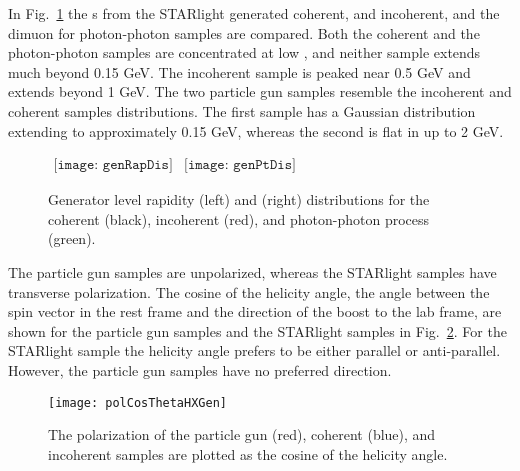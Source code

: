     In Fig.~\ref{fig:starlightRapPtDist} the \JPsi{}s \pt{} from the 
      STARlight generated coherent, and incoherent, and the dimuon \pt{} for 
      photon-photon samples are compared.
    Both the coherent and the photon-photon samples are concentrated at low 
      \pt{}, and neither sample extends much beyond 0.15 GeV.
    The incoherent sample is peaked near 0.5 GeV and extends beyond 1 GeV.
    The two particle gun samples resemble the incoherent and coherent samples
      \pt{} distributions.
    The first sample has a Gaussian \pt{} distribution extending to 
      approximately 0.15 GeV, whereas the second is flat in \pt{} up to
      2 GeV.
    \begin{figure}[!Hhbt]
      \centering
      $ \begin{array}{cc}
        \texttt{[image: genRapDis]} &
        \texttt{[image: genPtDis]}
      \end{array} $
      \caption{Generator level rapidity (left) and \pt{} (right) 
          distributions for the coherent (black), incoherent (red), 
          and photon-photon process (green).}
      \label{fig:starlightRapPtDist}
    \end{figure}

    The particle gun samples are unpolarized, whereas the STARlight samples 
      have transverse polarization.
    The cosine of the helicity angle, the angle between the \JPsi{} spin vector
      in the rest frame and the direction of the boost to the lab frame, are 
      shown for the particle gun samples and the STARlight samples in 
      Fig.~\ref{fig:genHXAngle}. 
    For the STARlight sample the helicity angle prefers to be either parallel or
      anti-parallel.
    However, the particle gun samples have no preferred direction.
    \begin{figure}[!Hhbt]
      \centering
      \texttt{[image: polCosThetaHXGen]}
      \caption{ The \JPsi{} polarization of the particle gun (red),
        coherent (blue), and incoherent samples are plotted as the
        cosine of the helicity angle.} 
      \label{fig:genHXAngle}
    \end{figure}

